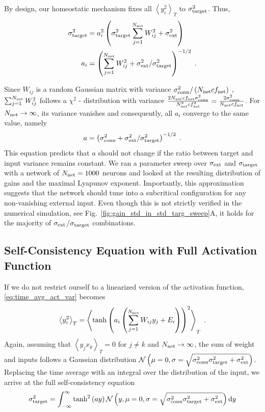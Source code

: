 \documentclass[10pt,a4paper]{article}
\newcommand{\avgt}[1]{\left< #1 \right>_T}
\begin{document}
By design, our homeostatic mechanism fixes all $\avgt{y_i^2}$ to $\sigma_{\rm target}^2$. Thus,
\begin{align}
	\sigma_{\rm target}^2 &= a_i^2 \left( \sigma_{\rm target}^2 \sum_{j=1}^{N_{\rm net}} W_{ij}^2 + \sigma_{\rm ext}^2 \right) \\ 
	a_i &= \left(\sum_{j=1}^{N_{\rm net}} W_{ij}^2 + \sigma_{\rm ext}^2 / \sigma_{\rm target}^2\right)^{-1/2} \; .
\end{align}

Since $W_{ij}$ is a random Gaussian matrix with variance $\sigma_{\rm conn}^2/\left( N_{\rm net} cf_{\rm net} \right)$ , $\sum_{j=1}^{N_{\rm net}} W_{ij}^2$ follows a $\chi^2$ - distribution with variance $\frac{2N_{\rm net} cf_{\rm net} \sigma_{\rm conn}^2}{N_{\rm net}^2 cf_{\rm net}^2} = \frac{2 \sigma_{\rm conn}^2}{N_{\rm net} cf_{\rm net}}$. For $N_{\rm net} \rightarrow \infty $, its variance vanishes and consequently, all $a_i$ converge to the same value, namely 
\begin{equation}
	a = \left(\sigma_{\rm conn}^2 + \sigma_{\rm ext}^2 / \sigma_{\rm target}^2\right)^{-1/2} \; . \label{eq:gain_pred}
\end{equation}
This equation predicts that $a$ should not change if the ratio between target and input variance remains constant. We ran a parameter sweep over $\sigma_{\rm ext}$ and $\sigma_{\rm target}$ with a network of $N_{\rm net} = 1000$ neurons and looked at the resulting distribution of gains and the maximal Lyapunov exponent. Importantly, this approximation suggests that the network should tune into a subcritical configuration for any non-vanishing external input. Even though this is not strictly verified in the numerical simulation, see Fig.~\ref{fig:gain_std_in_std_targ_sweep}A, it holds for the majority of $ \sigma_{\rm ext}$/$\sigma_{\rm target}$ combinations.

\subsection{Self-Consistency Equation with Full Activation Function}
If we do not restrict ourself to a linearized version of the activation function, \eqref{eq:time_avg_act_var} becomes
\begin{equation}
	\avgt{y_i^2} = \avgt{\tanh\left(a_i\left(\sum_{j=1}^{N_{\rm net}} W_{ij} y_j + E_i\right)\right)^2} \; .
\end{equation}
Again, assuming that $\avgt{y_j x_k}=0$ for $j\neq k$ and $N_{\rm net} \rightarrow \infty$, the sum of weight and inputs follows a Gaussian distribution $\mathcal{N}\left(\mu = 0, \sigma = \sqrt{\sigma^2_{\rm conn}\sigma^2_{\rm target} + \sigma^2_{\rm ext}}\right)$. Replacing the time average with an integral over the distribution of the input, we arrive at the full self-consistency equation
\begin{equation}
	\sigma^2_{\rm target} = \int_{-\infty}^{\infty}  \tanh^2\left(ay\right) \mathcal{N}\left(y, \mu = 0, \sigma = \sqrt{\sigma^2_{\rm conn}\sigma^2_{\rm target} + \sigma^2_{\rm ext}}\right)	\mathrm{d}y \label{eq:self-consistency_var_full}
\end{equation}
\end{document}
